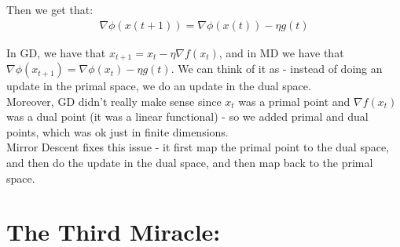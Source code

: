 \documentclass[11pt]{book} %
\begin{document}
Then we get that:
\begin{align*}
    \nabla \phi(x(t+1)) = \nabla \phi(x(t)) - \eta g(t)
\end{align*}

In GD, we have that $x_{t+1} = x_t - \eta \nabla f(x_t)$, and in MD we have that $\nabla \phi(x_{t+1}) = \nabla \phi(x_t) - \eta g(t)$.
We can think of it as - instead of doing an update in the primal space, we do an update in the dual space. \\
Moreover, GD didn't really make sense since $x_t$ was a primal point and $\nabla f(x_t)$ was a dual point (it was a linear functional) - 
so we added primal and dual points, which was ok just in finite dimensions. \\
Mirror Descent fixes this issue - it first map the primal point to the dual space, and then do the update in the dual space, and then map back to the primal space.



\chapter{The Third Miracle: }

\end{document}

